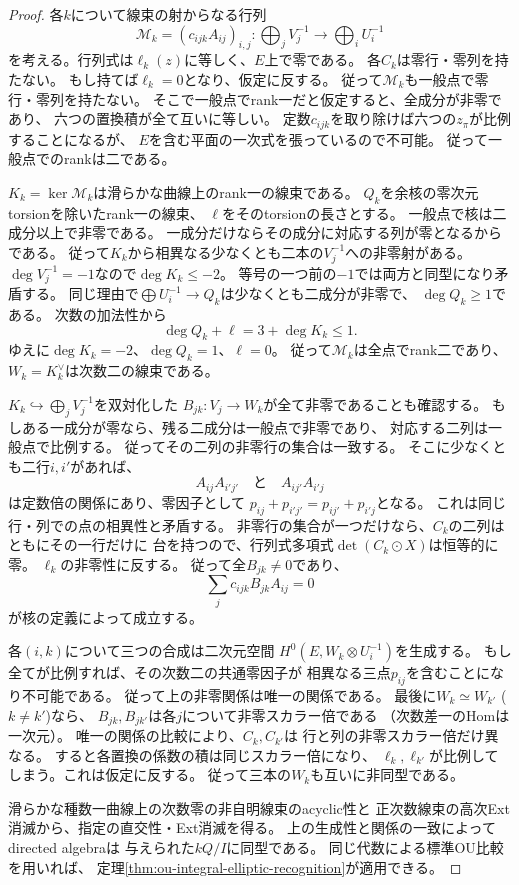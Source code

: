 \begin{proof}
各$k$について線束の射からなる行列
\[
 \mathscr M_k=(c_{ijk} A_{ij})_{i,j}:
 \bigoplus_j V_j^{-1}\longrightarrow\bigoplus_i U_i^{-1}
\]
を考える。行列式は$\ell_k(z)$に等しく、$E$上で零である。
各$C_k$は零行・零列を持たない。
もし持てば$\ell_k=0$となり、仮定に反する。
従って$\mathscr M_k$も一般点で零行・零列を持たない。
そこで一般点でrank一だと仮定すると、全成分が非零であり、
六つの置換積が全て互いに等しい。
定数$c_{ijk}$を取り除けば六つの$z_\pi$が比例することになるが、
$E$を含む平面の一次式を張っているので不可能。
従って一般点でのrankは二である。

$K_k=\ker\mathscr M_k$は滑らかな曲線上のrank一の線束である。
$Q_k$を余核の零次元torsionを除いたrank一の線束、
$\ell$をそのtorsionの長さとする。
一般点で核は二成分以上で非零である。
一成分だけならその成分に対応する列が零となるからである。
従って$K_k$から相異なる少なくとも二本の$V_j^{-1}$への非零射がある。
$\deg V_j^{-1}=-1$なので$\deg K_k\leq -2$。
等号の一つ前の$-1$では両方と同型になり矛盾する。
同じ理由で$\bigoplus U_i^{-1}\to Q_k$は少なくとも二成分が非零で、
$\deg Q_k\geq1$である。
次数の加法性から
\[
 \deg Q_k+\ell=3+\deg K_k\leq1.
\]
ゆえに$\deg K_k=-2$、$\deg Q_k=1$、$\ell=0$。
従って$\mathscr M_k$は全点でrank二であり、
$W_k=K_k^\vee$は次数二の線束である。

$K_k\hookrightarrow\bigoplus_j V_j^{-1}$を双対化した
$B_{jk}:V_j\to W_k$が全て非零であることも確認する。
もしある一成分が零なら、残る二成分は一般点で非零であり、
対応する二列は一般点で比例する。
従ってその二列の非零行の集合は一致する。
そこに少なくとも二行$i,i'$があれば、
\[
 A_{ij}A_{i'j'}\quad\text{と}\quad A_{ij'}A_{i'j}
\]
は定数倍の関係にあり、零因子として
$p_{ij}+p_{i'j'}=p_{ij'}+p_{i'j}$となる。
これは同じ行・列での点の相異性と矛盾する。
非零行の集合が一つだけなら、$C_k$の二列はともにその一行だけに
台を持つので、行列式多項式$\det(C_k\odot X)$は恒等的に零。
$\ell_k$の非零性に反する。
従って全$B_{jk}\ne0$であり、
\[
 \sum_j c_{ijk}B_{jk}A_{ij}=0
\]
が核の定義によって成立する。

各$(i,k)$について三つの合成は二次元空間
$H^0(E,W_k\otimes U_i^{-1})$を生成する。
もし全てが比例すれば、その次数二の共通零因子が
相異なる三点$p_{ij}$を含むことになり不可能である。
従って上の非零関係は唯一の関係である。
最後に$W_k\simeq W_{k'}$ ($k\ne k'$)なら、
$B_{jk},B_{jk'}$は各$j$について非零スカラー倍である
（次数差一のHomは一次元）。
唯一の関係の比較により、$C_k,C_{k'}$は
行と列の非零スカラー倍だけ異なる。
すると各置換の係数の積は同じスカラー倍になり、
$\ell_k,\ell_{k'}$が比例してしまう。これは仮定に反する。
従って三本の$W_k$も互いに非同型である。

滑らかな種数一曲線上の次数零の非自明線束のacyclic性と
正次数線束の高次Ext消滅から、指定の直交性・Ext消滅を得る。
上の生成性と関係の一致によってdirected algebraは
与えられた$kQ/I$に同型である。
同じ代数による標準OU比較を用いれば、
定理\ref{thm:ou-integral-elliptic-recognition}が適用できる。
\end{proof}

